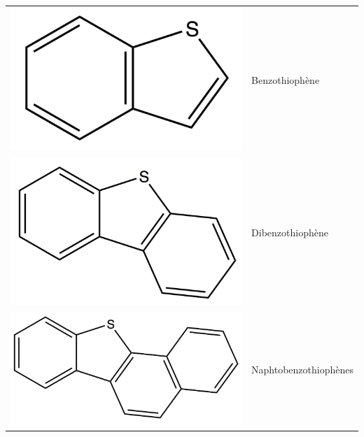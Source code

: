 \begin{table}[h!]
\begin{center}
\begin{tabular}{rl}
			\includegraphics[scale=0.08]{image/benzothiophene} & Benzothiophène \\
			\includegraphics[scale=0.08]{image/dibenzothiophene} & Dibenzothiophène \\
			\includegraphics[scale=0.08]{image/naphto1} & Naphtobenzothiophènes \\

\end{tabular}
\end{center}
\end{table}
